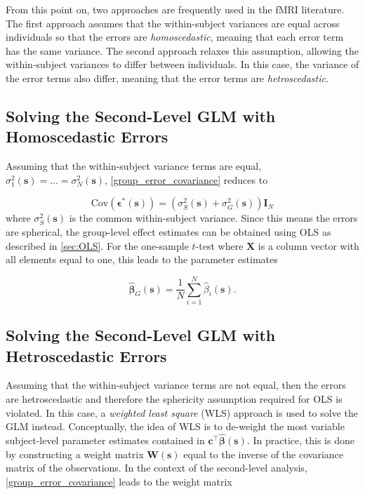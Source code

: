 From this point on, two approaches are frequently used in the fMRI literature. The first approach assumes that the within-subject variances are equal across individuals so that the errors are \textit{homoscedastic}, meaning that each error term has the same variance. The second approach relaxes this assumption, allowing the within-subject variances to differ between individuals. In this case, the variance of the error terms also differ, meaning that the error terms are \textit{hetroscedastic}.

\subsection{Solving the Second-Level GLM with Homoscedastic Errors}

Assuming that the within-subject variance terms are equal, $\sigma^{2}_{1}(\bm{s}) = ... = \sigma^{2}_{N}(\bm{s})$, \ref{group_error_covariance} reduces to

\begin{equation} 
\label{eq:group_homoscedastic_errors_covariance}
\mathrm{Cov}(\bm{\epsilon}^{*}(\bm{s})) = (\sigma_{S}^{2}(\bm{s}) + \sigma_{G}^{2}(\bm{s}))\bm{I}_{N}
\end{equation}
where $\sigma_{S}^{2}(\bm{s})$ is the common within-subject variance. Since this means the errors are spherical, the group-level effect estimates can be obtained using OLS as described in \ref{sec:OLS}. For the one-sample $t$-test where $\bm{X}$ is a column vector with all elements equal to one, this leads to the parameter estimates

\begin{equation} 
\label{eq:homoscedastic_parameter_estimates}
\hat{\bm{\beta}}_{G}(\bm{s}) = \frac{1}{N}\sum_{i=1}^{N} \hat{\beta}_{i}(\bm{s}).
\end{equation}

\subsection{Solving the Second-Level GLM with Hetroscedastic Errors}

Assuming that the within-subject variance terms are not equal, then the errors are hetroscedastic and therefore the sphericity assumption required for OLS is violated. In this case, a \textit{weighted least square} (WLS) approach is used to solve the GLM instead. Conceptually, the idea of WLS is to de-weight the most variable subject-level parameter estimates contained in $\bm{c}^{\intercal}\hat{\bm{\beta}}(\bm{s})$. In practice, this is done by constructing a weight matrix $\bm{W}(\bm{s})$ equal to the inverse of the covariance matrix of the observations. In the context of the second-level analysis, \ref{group_error_covariance} leads to the weight matrix 

